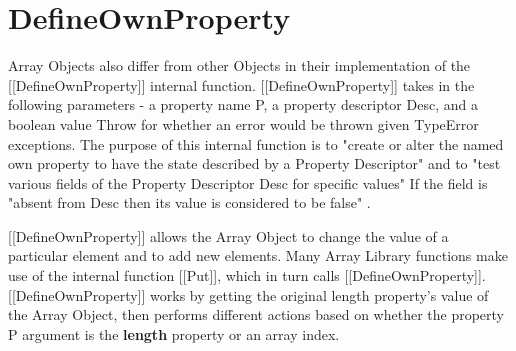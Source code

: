 \documentclass[a4paper,11pt,twoside]{report}
\begin{document}
\section{DefineOwnProperty}
Array Objects also differ from other Objects in their implementation of the [[DefineOwnProperty]] internal function. [[DefineOwnProperty]] takes in the following parameters - a property name P, a property descriptor Desc, and a boolean value Throw for whether an error would be thrown given TypeError exceptions. The purpose of this internal function is to "create or alter the named own property to have the state described by a Property Descriptor" and to "test various fields of the Property Descriptor Desc for specific values" If the field is "absent from Desc then its value is considered to be false" \cite{EcmaScript}. 

[[DefineOwnProperty]] allows the Array Object to change the value of a particular element and to add new elements. Many Array Library functions make use of the internal function [[Put]], which in turn calls [[DefineOwnProperty]]. [[DefineOwnProperty]] works by getting the original length property's value of the Array Object, then performs different actions based on whether the property P argument is the \textbf{length} property or an array index. 
\end{document}
